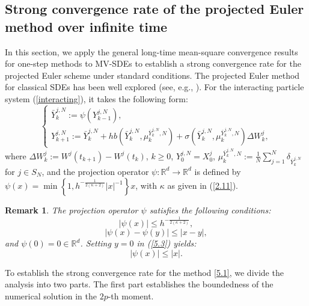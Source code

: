 \documentclass[12pt]{article}
\numberwithin{equation}{section}
\newtheorem{remark}[assumption]{Remark}
\begin{document}
\subsection{Strong convergence rate of the projected Euler method over infinite time}\label{strong convergence rate of the projected Euler method over infinite time}
In this section, we apply the general long-time mean-square convergence results for one-step methods to MV-SDEs to establish a strong convergence rate for the projected Euler scheme under standard conditions. The projected Euler method for classical SDEs has been well   explored  (see, e.g., \cite{Wolf-Jurgen2016project}). For the interacting particle system (\ref{interacting}), it takes the following form:
\begin{equation}\tag{3.15}\label{5.1}
\left\{\begin{array}{l}
\bar{Y}_{k}^{j,N}:=\psi\left(Y_{k-1}^{j,N}\right)
, \\
Y^{j,N}_{k+1}:=\bar{Y}^{j,N}_k+h b\left(\bar{Y}^{j,N}_k,\mu^{\bar{Y}^{j,N}_k,N}_k\right)+\sigma\left(\bar{Y}^{j,N}_k,\mu^{\bar{Y}^{j,N}_k,N}_k\right) \Delta W^{j}_{k},
\end{array}\right.
\end{equation}
where $\Delta W^{j}_{k}:=W^{j}\left(t_{k+1}\right)-W^{j}\left(t_{k}\right)$, $k \geq 0$, $Y^{j,N}_0=X^{j}_0$, $\mu^{\bar{Y}^{j,N}_k,N}_k:=\tfrac{1}{N} \sum_{j=1}^N \delta_{\bar{Y}^{j,N}_k}$ for $j\in S_{N}$, and the projection operator $\psi: \mathbb{R}^d \to \mathbb{R}^d$ is defined by
$\psi\left(x\right) = \min \left\{ 1, h^{-\frac{1}{2\left(\kappa + 2\right)}} \left|x\right|^{-1} \right\} x$, with $\kappa$ as given in (\ref{2.11}).
\begin{remark}\label{ass5.1}
The projection operator $\psi$ satisfies the following conditions:
\begin{equation}\tag{3.16}\label{5.2}
\left|\psi\left(x\right)\right| \leq h^{-\frac{1}{2\left(\kappa+2\right)}}, 
\end{equation}
\begin{equation}\tag{3.17}\label{5.3}
\left|\psi\left(x\right)-\psi\left(y\right)\right|  \leq\left|x-y\right|,
\end{equation}
and $\psi(0)=0 \in \mathbb{R}^d$. Setting $y=0$ in (\ref{5.3}) yields:
\begin{equation}\tag{3.18}\label{5.4}
\left|\psi\left(x\right)\right| \leq\left|x\right|.
\end{equation}
\end{remark}

To establish the strong convergence rate for the method \eqref{5.1}, we divide the analysis into two parts. The first part establishes the boundedness of the numerical solution in the $2p$-th moment. %
\end{document}
